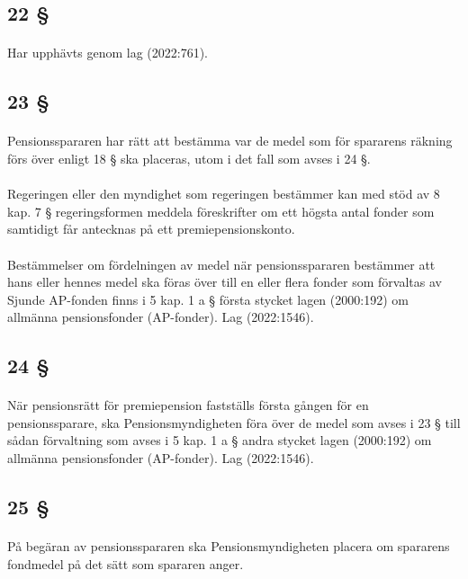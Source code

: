 \documentclass[a4paper,notitlepage,openany,10pt]{book}
\begin{document}
\subsection*{22 §}
\paragraph*{}
Har upphävts genom
lag (2022:761).
\subsection*{23 §}
\paragraph*{}
Pensionsspararen har rätt att bestämma var de medel som för spararens räkning förs över enligt 18 § ska placeras, utom i det fall som avses i 24 §.
\paragraph*{}
Regeringen eller den myndighet som regeringen bestämmer kan med stöd av 8 kap. 7 § regeringsformen meddela föreskrifter om ett högsta antal fonder som samtidigt får antecknas på ett premiepensionskonto.
\paragraph*{}
Bestämmelser om fördelningen av medel när pensionsspararen bestämmer att hans eller hennes medel ska föras över till en eller flera fonder som förvaltas av Sjunde AP-fonden finns i 5 kap. 1 a § första stycket lagen (2000:192) om allmänna pensionsfonder (AP-fonder).
Lag (2022:1546).
\subsection*{24 §}
\paragraph*{}
När pensionsrätt för premiepension fastställs första gången för en pensionssparare, ska Pensionsmyndigheten föra över de medel som avses i 23 § till sådan förvaltning som avses i 5 kap. 1 a § andra stycket lagen (2000:192) om allmänna pensionsfonder (AP-fonder).
Lag (2022:1546).
\subsection*{25 §}
\paragraph*{}
På begäran av pensionsspararen ska Pensionsmyndigheten placera om spararens fondmedel på det sätt som spararen anger.
\end{document}
